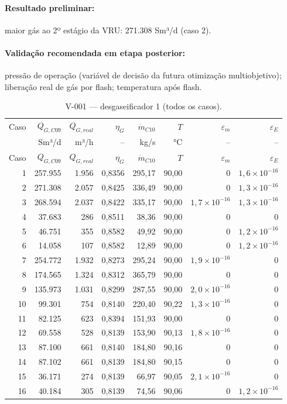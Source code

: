 \documentclass[11pt,a4paper]{article}
\numberwithin{equation}{section}
\numberwithin{table}{section}
\numberwithin{figure}{section}
\begin{document}
\paragraph{Resultado preliminar:} maior gás ao 2º estágio da VRU: 271.308 Sm³/d (caso 2).
\paragraph{Validação recomendada em etapa posterior:} pressão de operação (variável de decisão da futura otimização multiobjetivo); liberação real de gás por flash; temperatura após flash.
{\footnotesize\setlength{\tabcolsep}{3.5pt}\begin{longtable}{rrrrrrrr}
\caption{V-001 --- desgaseificador 1 (todos os casos).\label{tab:b05}}\\\toprule
Caso & $Q_{G,C09}$ & $Q_{G,real}$ & $\eta_{G}$ & $\dot m_{C10}$ & $T$ & $\varepsilon_m$ & $\varepsilon_E$\\
 & Sm³/d & m³/h & -- & kg/s & °C & -- & --\\\midrule\endfirsthead
\toprule Caso & $Q_{G,C09}$ & $Q_{G,real}$ & $\eta_{G}$ & $\dot m_{C10}$ & $T$ & $\varepsilon_m$ & $\varepsilon_E$\\\midrule\endhead
1 & 257.955 & 1.956 & 0,8356 & 295,17 & 90,00 & $0$ & $1{,}6\times10^{-16}$\\
2 & 271.308 & 2.057 & 0,8425 & 336,49 & 90,00 & $0$ & $1{,}3\times10^{-16}$\\
3 & 268.594 & 2.037 & 0,8422 & 335,17 & 90,00 & $1{,}7\times10^{-16}$ & $1{,}3\times10^{-16}$\\
4 & 37.683 & 286 & 0,8511 & 38,36 & 90,00 & $0$ & $0$\\
5 & 46.751 & 355 & 0,8582 & 49,92 & 90,00 & $0$ & $1{,}2\times10^{-16}$\\
6 & 14.058 & 107 & 0,8582 & 12,89 & 90,00 & $0$ & $1{,}2\times10^{-16}$\\
7 & 254.772 & 1.932 & 0,8273 & 295,24 & 90,00 & $1{,}9\times10^{-16}$ & $0$\\
8 & 174.565 & 1.324 & 0,8312 & 365,79 & 90,00 & $0$ & $0$\\
9 & 135.973 & 1.031 & 0,8299 & 287,55 & 90,00 & $2{,}0\times10^{-16}$ & $0$\\
10 & 99.301 & 754 & 0,8140 & 220,40 & 90,22 & $1{,}3\times10^{-16}$ & $0$\\
11 & 82.125 & 623 & 0,8394 & 151,93 & 90,00 & $0$ & $0$\\
12 & 69.558 & 528 & 0,8139 & 153,90 & 90,13 & $1{,}8\times10^{-16}$ & $0$\\
13 & 87.100 & 661 & 0,8140 & 184,80 & 90,16 & $0$ & $0$\\
14 & 87.102 & 661 & 0,8139 & 184,80 & 90,15 & $0$ & $0$\\
15 & 36.171 & 274 & 0,8139 & 66,97 & 90,05 & $2{,}1\times10^{-16}$ & $0$\\
16 & 40.184 & 305 & 0,8139 & 74,56 & 90,06 & $0$ & $1{,}2\times10^{-16}$\\
\bottomrule\end{longtable}}
\end{document}
